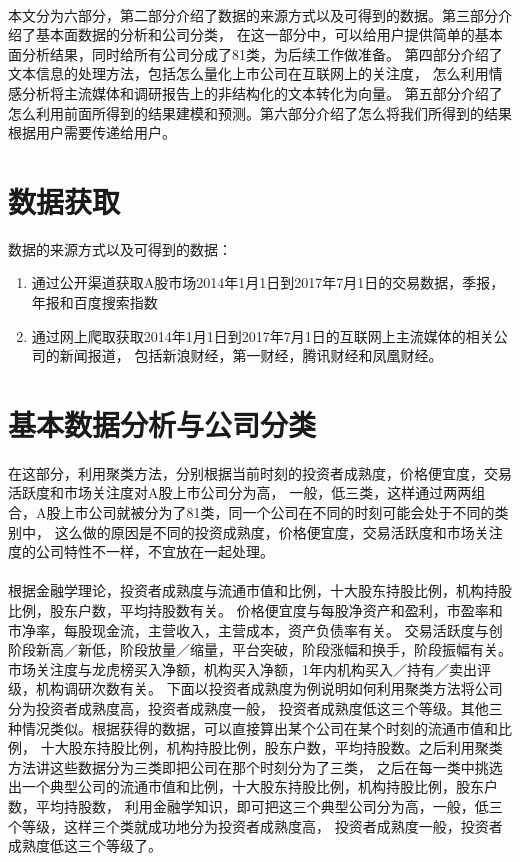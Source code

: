 \documentclass[UTF8]{ctexart}
\begin{document}
\paragraph*{}
本文分为六部分，第二部分介绍了数据的来源方式以及可得到的数据。第三部分介绍了基本面数据的分析和公司分类，
在这一部分中，可以给用户提供简单的基本面分析结果，同时给所有公司分成了81类，为后续工作做准备。
第四部分介绍了文本信息的处理方法，包括怎么量化上市公司在互联网上的关注度，
怎么利用情感分析将主流媒体和调研报告上的非结构化的文本转化为向量。
第五部分介绍了怎么利用前面所得到的结果建模和预测。第六部分介绍了怎么将我们所得到的结果根据用户需要传递给用户。

\section{数据获取}
数据的来源方式以及可得到的数据：
\begin{enumerate}
  \item 通过公开渠道获取A股市场2014年1月1日到2017年7月1日的交易数据，季报，年报和百度搜索指数
  \item 通过网上爬取获取2014年1月1日到2017年7月1日的互联网上主流媒体的相关公司的新闻报道，
  包括新浪财经，第一财经，腾讯财经和凤凰财经。
\end{enumerate}


\section{基本数据分析与公司分类}
\paragraph*{}
在这部分，利用聚类方法，分别根据当前时刻的投资者成熟度，价格便宜度，交易活跃度和市场关注度对A股上市公司分为高，
一般，低三类，这样通过两两组合，A股上市公司就被分为了81类，同一个公司在不同的时刻可能会处于不同的类别中，
这么做的原因是不同的投资成熟度，价格便宜度，交易活跃度和市场关注度的公司特性不一样，不宜放在一起处理。
\paragraph*{}
根据金融学理论，投资者成熟度与流通市值和比例，十大股东持股比例，机构持股比例，股东户数，平均持股数有关。
价格便宜度与每股净资产和盈利，市盈率和市净率，每股现金流，主营收入，主营成本，资产负债率有关。
交易活跃度与创阶段新高／新低，阶段放量／缩量，平台突破，阶段涨幅和换手，阶段振幅有关。
市场关注度与龙虎榜买入净额，机构买入净额，1年内机构买入／持有／卖出评级，机构调研次数有关。
下面以投资者成熟度为例说明如何利用聚类方法将公司分为投资者成熟度高，投资者成熟度一般，
投资者成熟度低这三个等级。其他三种情况类似。根据获得的数据，可以直接算出某个公司在某个时刻的流通市值和比例，
十大股东持股比例，机构持股比例，股东户数，平均持股数。之后利用聚类方法讲这些数据分为三类即把公司在那个时刻分为了三类，
之后在每一类中挑选出一个典型公司的流通市值和比例，十大股东持股比例，机构持股比例，股东户数，平均持股数，
利用金融学知识，即可把这三个典型公司分为高，一般，低三个等级，这样三个类就成功地分为投资者成熟度高，
投资者成熟度一般，投资者成熟度低这三个等级了。
\end{document}
